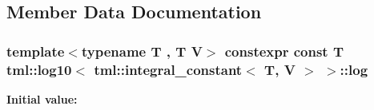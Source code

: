 \subsection{Member Data Documentation}
\hypertarget{structtml_1_1log10_3_01tml_1_1integral__constant_3_01T_00_01V_01_4_01_4_aca436c2ec41ded0708c0e89c03b9c413}{
\subsubsection[{log}]{\setlength{\rightskip}{0pt plus 5cm}template$<$typename T , T V$>$ constexpr const T {\bf tml\+::log10}$<$ tml\+::integral\+\_\+constant$<$ T, V $>$ $>$\+::log\hspace{0.3cm}{\ttfamily [static]}}}\label{structtml_1_1log10_3_01tml_1_1integral__constant_3_01T_00_01V_01_4_01_4_aca436c2ec41ded0708c0e89c03b9c413}
{\bfseries Initial value\+:}
